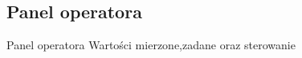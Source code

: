 \subsection{Panel operatora}
\label{lab:zad5}


%    

Panel	operatora
Wartości	mierzone,zadane	oraz	sterowanie

\newpage
